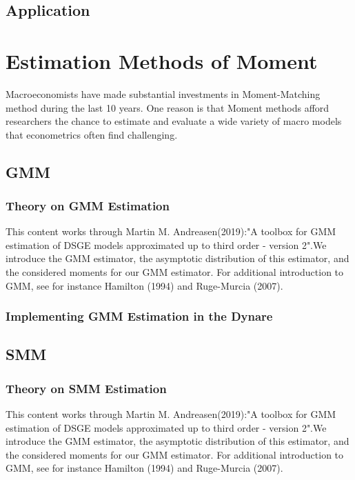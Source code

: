 \documentclass[10pt,math=newtx,citestyle=gb7714-2015,bibstyle=gb7714-2015]{elegantbook}
\begin{document}
{{{	
	\section{Application}
	
	
	
	
	
	\chapter{Estimation Methods of Moment}
	
	Macroeconomists have made substantial investments in Moment-Matching method during the last 10 years. One reason is that Moment methods afford researchers the chance to estimate and evaluate a wide variety of macro models that econometrics often find challenging.
	
	\section{GMM}
	
	\subsection{Theory on GMM Estimation}
	This content works through Martin M. Andreasen(2019):"A toolbox for GMM estimation of DSGE models approximated up to third order - version 2".We introduce the GMM estimator, the asymptotic distribution of this estimator, and the considered moments for our GMM estimator. For additional introduction to GMM, see for instance Hamilton (1994) and Ruge-Murcia (2007).
	
	\subsection{Implementing GMM Estimation in the Dynare}
	
	
	\section{SMM}
	
	\subsection{Theory on SMM Estimation}
	This content works through Martin M. Andreasen(2019):"A toolbox for GMM estimation of DSGE models approximated up to third order - version 2".We introduce the GMM estimator, the asymptotic distribution of this estimator, and the considered moments for our GMM estimator. For additional introduction to GMM, see for instance Hamilton (1994) and Ruge-Murcia (2007).
	
}}}
\end{document}
